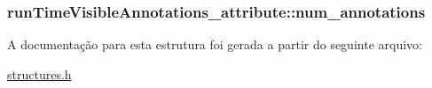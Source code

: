 \subsubsection[{\texorpdfstring{num\+\_\+annotations}{num_annotations}}]{ run\+Time\+Visible\+Annotations\+\_\+attribute\+::num\+\_\+annotations}\hypertarget{structrunTimeVisibleAnnotations__attribute_a1b180c3313acd68fb6956135bad01345}{}\label{structrunTimeVisibleAnnotations__attribute_a1b180c3313acd68fb6956135bad01345}


A documentação para esta estrutura foi gerada a partir do seguinte arquivo\+:\begin{DoxyCompactItemize}
\item 
\hyperlink{structures_8h}{structures.\+h}\end{DoxyCompactItemize}
